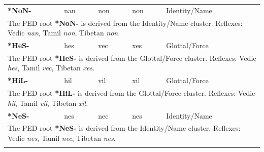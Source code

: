 \begin{longtable}{p{} p{} p{} p{} p{}}
\textbf{*NoN-} & nan & non & non & Identity/Name \\ 
\multicolumn{5}{p{\textwidth}}{\small The PED root \textbf{*NoN-} is derived from the Identity/Name cluster. Reflexes: Vedic \textit{nan}, Tamil \textit{non}, Tibetan \textit{non}. } \\ \addlinespace 
\textbf{*HeS-} & hes & vec & xes & Glottal/Force \\ 
\multicolumn{5}{p{\textwidth}}{\small The PED root \textbf{*HeS-} is derived from the Glottal/Force cluster. Reflexes: Vedic \textit{hes}, Tamil \textit{vec}, Tibetan \textit{xes}. } \\ \addlinespace 
\textbf{*HiL-} & hil & vil & xil & Glottal/Force \\ 
\multicolumn{5}{p{\textwidth}}{\small The PED root \textbf{*HiL-} is derived from the Glottal/Force cluster. Reflexes: Vedic \textit{hil}, Tamil \textit{vil}, Tibetan \textit{xil}. } \\ \addlinespace 
\textbf{*NeS-} & nes & nec & nes & Identity/Name \\ 
\multicolumn{5}{p{\textwidth}}{\small The PED root \textbf{*NeS-} is derived from the Identity/Name cluster. Reflexes: Vedic \textit{nes}, Tamil \textit{nec}, Tibetan \textit{nes}. } \\ \addlinespace 
\end{longtable}

